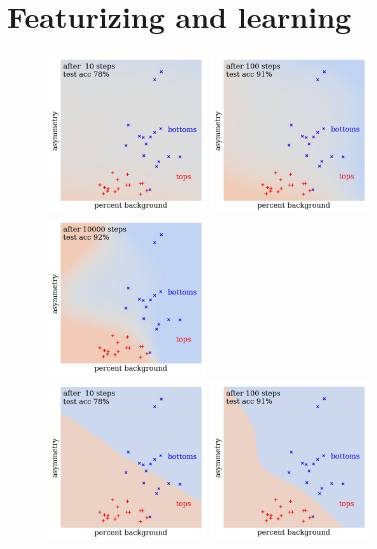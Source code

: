 \documentclass[openany, notitlepage, justified]{tufte-book}
\begin{document}
        \section{Featurizing and learning}
            \begin{figure}[h]
                \centering
                \includegraphics[height=4.2cm]{yo-10-0016-soft-10}
                \includegraphics[height=4.2cm]{yo-10-0016-soft-100}
                \includegraphics[height=4.2cm]{yo-10-0016-soft-10000}
                \\
                \includegraphics[height=4.2cm]{yo-10-0016-hard-10}
                \includegraphics[height=4.2cm]{yo-10-0016-hard-100}

\end{figure}
\end{document}
